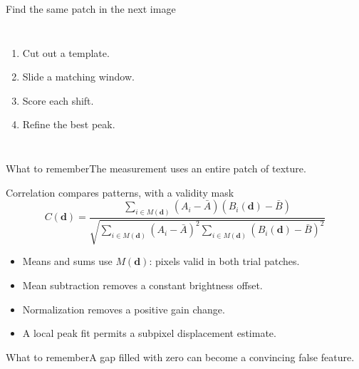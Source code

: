 \documentclass[aspectratio=169,11pt]{beamer}
\newcommand{\prov}{}
\newcommand{\evidence}[1]{\gdef\prov{#1}}
\newcommand{\takeaway}[1]{\vspace{0.3em}\begin{block}{What to remember}#1\end{block}}
\begin{document}
\evidence{Original template-matching diagram; simplified synthetic texture.}
\begin{frame}{Find the same patch in the next image}
 \begin{columns}[c]
 \begin{enumerate}
  \item Cut out a template.
  \item Slide a matching window.
  \item Score each shift.
  \item Refine the best peak.
 \end{enumerate}
 \end{columns}
 \takeaway{The measurement uses an entire patch of texture.}
\end{frame}

\evidence{Concrete teaching implementation: src/jiram\_catalog/tracking.py; original Tracker equivalence is unverified.}
\begin{frame}{Correlation compares patterns, with a validity mask}
 \[
 C(\bm d)=\frac{\sum_{i\in M(\bm d)}(A_i-\bar A)(B_i(\bm d)-\bar B)}
 {\sqrt{\sum_{i\in M(\bm d)}(A_i-\bar A)^2
 \sum_{i\in M(\bm d)}(B_i(\bm d)-\bar B)^2}}
 \]
 \begin{itemize}
  \item Means and sums use $M(\bm d)$: pixels valid in both trial patches.
  \item Mean subtraction removes a constant brightness offset.
  \item Normalization removes a positive gain change.
  \item A local peak fit permits a subpixel displacement estimate.
 \end{itemize}
 \takeaway{A gap filled with zero can become a convincing false feature.}
\end{frame}
\end{document}
